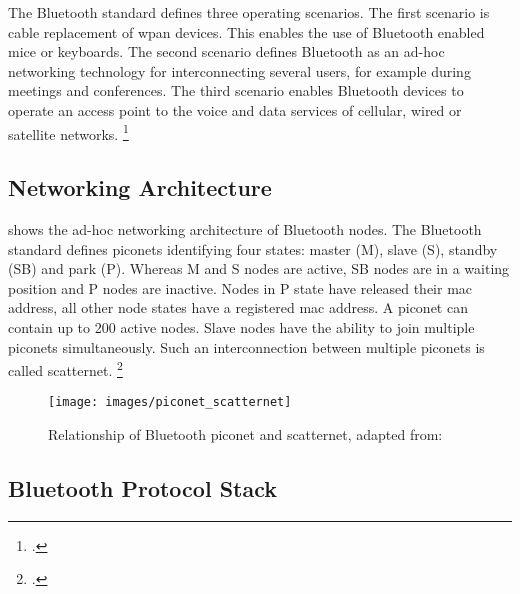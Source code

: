 The Bluetooth standard defines three operating scenarios. The first scenario is cable replacement of \gls{wpan} devices. This enables the use of Bluetooth enabled mice or keyboards. The second scenario defines Bluetooth as an ad-hoc networking technology for interconnecting several users, for example during meetings and conferences. The third scenario enables Bluetooth devices to operate an access point to the voice and data services of cellular, wired or satellite networks. \footcite[Cf.][445-446]{Pahlavan2009}

\subsection{Networking Architecture}

 shows the ad-hoc networking architecture of Bluetooth nodes. The Bluetooth standard defines piconets identifying four states: master (M), slave (S), standby (SB) and park (P). Whereas M and S nodes are active, SB nodes are in a waiting position and P nodes are inactive. Nodes in P state have released their \gls{mac} address, all other node states have a registered \gls{mac} address. A piconet can contain up to 200 active nodes. Slave nodes have the ability to join multiple piconets simultaneously. Such an interconnection between multiple piconets is called scatternet. \footcite[Cf.][446-448]{Pahlavan2009}

\begin{figure}[ht]
  \centering
  \texttt{[image: images/piconet\_scatternet]}
  \caption{Relationship of Bluetooth piconet and scatternet, adapted from: \cite[690]{Garg2007}}
  \label{fig:piconet_scatternet}
\end{figure}

\subsection{Bluetooth Protocol Stack}

